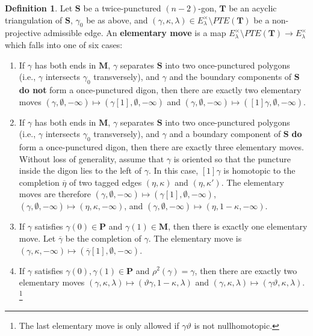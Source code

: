 \documentclass[11pt]{amsart}
\theoremstyle{plain}
\theoremstyle{definition}
\newtheorem{definition}[theorem]{Definition}
\numberwithin{equation}{section}
\def\surf{\mathbf{S}}                       %
\def\TT{\mathbf{T}}
\def\PP{\mathbf{P}}
\def\MM{\mathbf{M}}
\begin{document}
\begin{definition}
    Let $\surf$ be a twice-punctured $(n-2)$-gon, $\TT$ be an acyclic triangulation of $\surf$, $\gamma_0$ be as above, and $(\gamma,\kappa,\lambda) \in E^\times_\lambda \setminus PTE(\TT)$ be a non-projective admissible edge. 
    An \textbf{elementary move} is a map $E^\times_\lambda \setminus PTE(\TT) \to E^\times_\lambda$ which falls into one of six cases:
    \begin{enumerate}
        \item If $\gamma$ has both ends in $\MM$, $\gamma$ separates $\surf$ into two once-punctured polygons (i.e., $\gamma$ intersects $\gamma_0$ transversely), and $\gamma$ and the boundary components of $\surf$ \textbf{do not} form a once-punctured digon, then there are exactly two elementary moves $( \gamma, \emptyset, -\infty ) \mapsto ( \gamma[1], \emptyset, -\infty )$ and $( \gamma, \emptyset, -\infty ) \mapsto ( [1]\gamma, \emptyset, -\infty ).$
        \item If $\gamma$ has both ends in $\MM$, $\gamma$ separates $\surf$ into two once-punctured polygons (i.e., $\gamma$ intersects $\gamma_0$ transversely), and $\gamma$ and a boundary component of $\surf$ \textbf{do} form a once-punctured digon, then there are exactly three elementary moves. 
        Without loss of generality, assume that $\gamma$ is oriented so that the puncture inside the digon lies to the left of $\gamma$. 
        In this case, $[1]\gamma$ is homotopic to the completion $\overline{\eta}$ of two tagged edges $(\eta,\kappa)$ and $(\eta,\kappa')$. 
        The elementary moves are therefore $( \gamma, \emptyset, -\infty ) \mapsto ( \gamma[1], \emptyset, -\infty )$, $( \gamma, \emptyset, -\infty ) \mapsto ( \eta, \kappa, -\infty)$, and $( \gamma, \emptyset, -\infty ) \mapsto ( \eta, 1-\kappa, -\infty).$
        \item If $\gamma$ satisfies $\gamma(0) \in \PP$ and $\gamma(1) \in \MM$, then there is exactly one elementary move. Let $\overline{\gamma}$ be the completion of $\gamma$. The elementary move is $( \gamma, \kappa, -\infty ) \mapsto ( \overline{\gamma}[1], \emptyset, -\infty ).$ 
        \item If $\gamma$ satisfies $\gamma(0), \gamma(1) \in \PP$ and $\rho^2(\gamma) = \gamma$, then there are exactly two elementary moves $( \gamma, \kappa, \lambda ) \mapsto ( \vartheta\gamma, 1-\kappa, \lambda )$ and $( \gamma, \kappa, \lambda ) \mapsto ( \gamma\vartheta, \kappa, \lambda ).$\footnote{The last elementary move is only allowed if $\gamma\vartheta$ is not nullhomotopic.}

\end{enumerate}
\end{definition}
\end{document}
